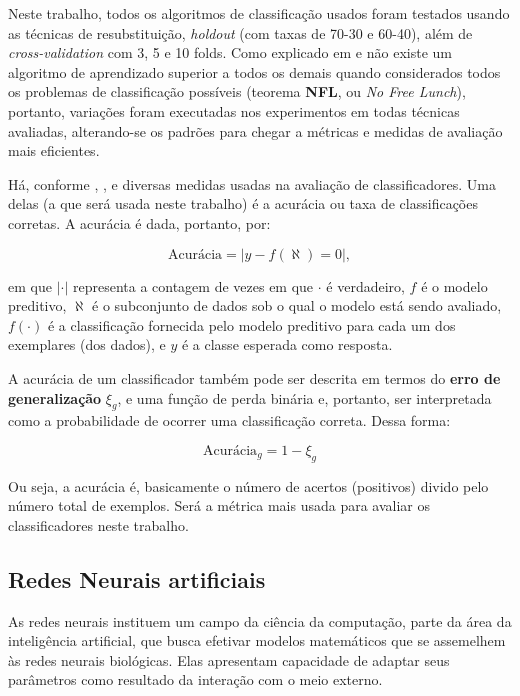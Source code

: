 Neste trabalho, todos os algoritmos de classificação usados foram testados usando as técnicas de resubstituição, \textit{holdout} (com taxas de 70-30 e 60-40), além de \textit{cross-validation} com 3, 5 e 10 folds. Como explicado em \cite{WolpertMacready} e \cite{Wolpert:1996} não existe um algoritmo de aprendizado superior a todos os demais quando considerados todos os problemas de classificação possíveis (teorema \textbf{NFL}, ou \textit{No Free Lunch}), portanto, variações foram executadas nos experimentos em todas técnicas avaliadas, alterando-se os padrões para chegar a métricas e medidas de avaliação mais eficientes.

Há, conforme \cite{Boscarioli2017}, \cite{aprenda_mineracao_fernando_amaral16}, \cite{classification2013} e \cite{classification_survey2012} diversas medidas usadas na avaliação de classificadores. Uma delas (a que será usada neste trabalho) é a acurácia ou taxa de classificações corretas. A acurácia é dada, portanto, por:

\begin{equation}\label{acuracia}
\text{Acurácia} = |y-f(\aleph)=0|,
\end{equation}

em que $|\cdot|$ representa a contagem de vezes em que $\cdot$ é verdadeiro, $f$ é o modelo preditivo, $\aleph$ é o subconjunto de dados sob o qual o modelo está sendo avaliado, $f(\cdot)$ é a classificação fornecida pelo modelo preditivo para cada um dos exemplares (dos dados), e $y$ é a classe esperada como resposta. \cite{Boscarioli2017}

A acurácia de um classificador também pode ser descrita em termos do \textbf{erro de generalização} $\xi_g$, e uma função de perda binária e, portanto, ser interpretada como a probabilidade de ocorrer uma classificação correta. Dessa forma:

\begin{equation}
\text{Acurácia}_g=1 - \xi_g
\end{equation}

Ou seja, a acurácia é, basicamente o número de acertos (positivos) divido pelo número total de exemplos. Será a métrica mais usada para avaliar os classificadores neste trabalho.

\subsection{Redes Neurais artificiais}
As redes neurais instituem um campo da ciência da computação, parte da área da inteligência artificial, que busca efetivar modelos matemáticos que se assemelhem às redes neurais biológicas. Elas apresentam capacidade de adaptar seus parâmetros como resultado da interação com o meio externo. \cite{ferneda_redes_2006}\cite{Norvig2013}

